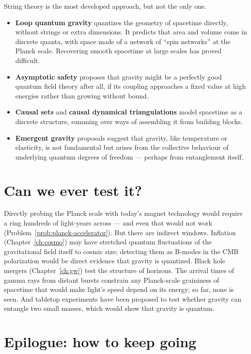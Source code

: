 String theory is the most developed approach, but not the only one.
\begin{itemize}[itemsep=3pt]
  \item \textbf{Loop quantum gravity} quantizes the geometry of spacetime directly, without strings or extra dimensions. It predicts that area and volume come in discrete quanta, with space made of a network of ``spin networks'' at the Planck scale. Recovering smooth spacetime at large scales has proved difficult.
  \item \textbf{Asymptotic safety} proposes that gravity might be a perfectly good quantum field theory after all, if its coupling approaches a fixed value at high energies rather than growing without bound.
  \item \textbf{Causal sets} and \textbf{causal dynamical triangulations} model spacetime as a discrete structure, summing over ways of assembling it from building blocks.
  \item \textbf{Emergent gravity} proposals suggest that gravity, like temperature or elasticity, is not fundamental but arises from the collective behaviour of underlying quantum degrees of freedom --- perhaps from entanglement itself.
\end{itemize}

\section{Can we ever test it?}

Directly probing the Planck scale with today's magnet technology would require a ring hundreds of light-years across --- and even that would not work (Problem~\ref{prob:planck-accelerator}). But there are indirect windows. Inflation (Chapter~\ref{ch:cosmo}) may have stretched quantum fluctuations of the gravitational field itself to cosmic size; detecting them as B-modes in the CMB polarization would be direct evidence that gravity is quantized. Black hole mergers (Chapter~\ref{ch:gw}) test the structure of horizons. The arrival times of gamma rays from distant bursts constrain any Planck-scale graininess of spacetime that would make light's speed depend on its energy; so far, none is seen. And tabletop experiments have been proposed to test whether gravity can entangle two small masses, which would show that gravity is quantum.

\section{Epilogue: how to keep going}

